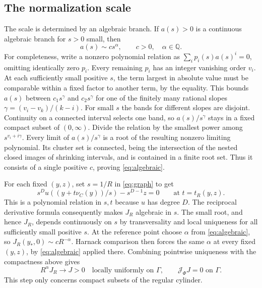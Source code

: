 \documentclass[11pt]{amsart}
\begin{document}
\subsection{The normalization scale}

The scale is determined by an algebraic branch.
If \(a(s)>0\) is a continuous algebraic branch for \(s>0\) small,
then
\begin{equation}\label{eq:algebraic}
 a(s)\sim c s^\alpha,\qquad c>0,\quad \alpha\in\mathbb Q.
\end{equation}
For completeness, write a nonzero polynomial relation as
\(\sum_i p_i(s)a(s)^i=0\), omitting identically zero \(p_i\).
Every remaining \(p_i\) has an integer vanishing order \(v_i\).
At each sufficiently small positive \(s\), the term largest in
absolute value must be comparable within a fixed factor to
another term, by the equality. This bounds \(a(s)\) between
\(c_1s^\gamma\) and \(c_2s^\gamma\) for one of the finitely many
rational slopes \(\gamma=(v_i-v_k)/(k-i)\). For small \(s\)
the bands for different slopes are disjoint. Continuity on a
connected interval selects one band, so \(a(s)/s^\gamma\) stays
in a fixed compact subset of \((0,\infty)\). Divide the relation
by the smallest power among \(s^{v_i+i\gamma}\). Every limit
of \(a(s)/s^\gamma\) is a root of the resulting nonzero limiting
polynomial. Its cluster set is connected, being the intersection
of the nested closed images of shrinking intervals, and is
contained in a finite root set. Thus it consists of a single
positive \(c\), proving \eqref{eq:algebraic}.

For each fixed \((y,z)\), set \(s=1/R\) in \eqref{eq:graph} to get
\[
 s^D u((y+t\nu_C(y))/s)-s^{D-1}z=0
 \qquad\text{at }t=t_R(y,z).
\]
This is a polynomial relation in \(s,t\) because \(u\) has degree \(D\).
The reciprocal derivative formula consequently makes \(J_R\) algebraic
in \(s\).
The small root, and hence \(J_R\), depends continuously on \(s\)
by transversality and local uniqueness for all sufficiently
small positive \(s\). At the reference point choose \(\alpha\)
from \eqref{eq:algebraic}, so \(J_R(y_*,0)\sim c R^{-\alpha}\). Harnack
comparison then forces the same \(\alpha\) at every fixed
\((y,z)\), by \eqref{eq:algebraic} applied there. Combining pointwise uniqueness
with the compactness above gives
\begin{equation}\label{eq:limit}
 R^\alpha J_R\longrightarrow J>0
 \quad\text{locally uniformly on }\Gamma,\qquad
 \mathcal J_\Phi J=0\text{ on }\Gamma.
\end{equation}
This step only concerns compact subsets of the regular cylinder.
\end{document}
